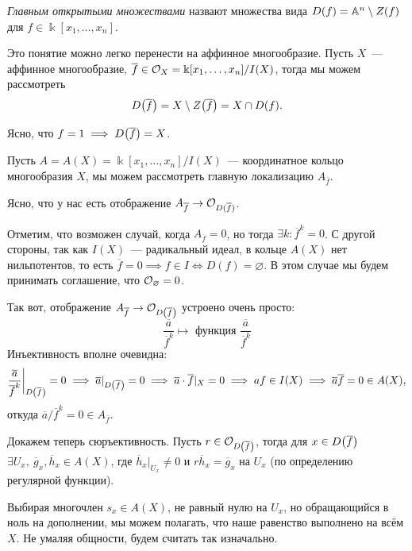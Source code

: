 	
	 \begin{definition} 
	 	\emph{Главным открытыми множествами} назвают множества вида $D(f) = \AA^n \setminus Z(f)$ для $f \in \Bbbk[x_1, \ldots, x_n]$.
	 \end{definition}

	 Это понятие можно легко перенести на аффинное многообразие. Пусть $X$~--- аффинное многообразие, $\overline{f} \in \cO_{X} = \Bbbk[x_1, \ldots, x_n]/I(X)$, тогда мы можем рассмотреть 
	 \[
	 	D\lr*{\overline{f}} = X \setminus Z\lr*{\overline{f}} = X \cap D(f).
	 \]

	 \begin{remark}
	 	Ясно, что $f = 1 \implies D\lr*{\overline{f}} = X$.
	 \end{remark}

	 Пусть $A = A(X) =  \Bbbk[x_1, \ldots, x_n]/I(X)$~--- координатное кольцо многообразия $X$, мы можем рассмотреть главную локализацию $A_{\overline{f}}$. 

	 Ясно, что у нас есть отображение $A_{\overline{f}} \to \cO_{D(\overline{f})}$. 

	 \begin{remark}
	 	Отметим, что возможен случай, когда $A_{\overline{f}} = 0$, но тогда $\exists k\colon \overline{f}^k = 0$. С другой стороны, так как $I(X)$~--- радикальный идеал, в кольце $A(X)$ нет нильпотентов, то есть $\overline{f} = 0 \implies f \in I \Leftrightarrow D(f) = \varnothing$. В этом случае мы будем принимать соглашение, что $\cO_{\varnothing} = 0$.  	
	 \end{remark}
	 
	 Так вот, отображение $A_{\overline{f}} \to \cO_{D\lr*{\overline{f}}}$ устроено очень просто: 
	 \[
	 	\frac{\overline{a}}{\overline{f}^k} \mapsto \text{ функция } \frac{\overline{a}}{\overline{f}^k}
	 \]
	 Инъективность вполне очевидна:
	 \[
	 	\frac{\overline{a}}{\overline{f}^k}\bigg\vert_{D\lr*{\overline{f}}} = 0 \implies \overline{a}\vert_{D\lr*{\overline{f}}} = 0 \implies \overline{a}\cdot \overline{f}\vert_{X} = 0 \implies af \in I(X) \implies \overline{a} \overline{f} = 0 \in A(X),
	 \]
	 откуда $\overline{a}/\overline{f}^k = 0 \in A_{\overline{f}}$.

	 Докажем теперь сюръективность. Пусть $r \in \cO_{D\lr*{\overline{f}}}$, тогда для $x \in D\lr*{\overline{f}}$ $\exists U_x, \ \overline{g}_x, \overline{h}_x \in A(X)$, где $\overline{h}_x\vert_{U_x} \neq 0$ и $r \overline{h}_x = \overline{g}_x$ на $U_x$ (по определению регулярной функции). 

	 Выбирая многочлен $s_x \in A(X)$, не равный нулю на $U_x$, но обращающийся в ноль на дополнении, мы можем полагать, что наше равенство выполнено на всём $X$. Не умаляя общности, будем считать так изначально. 

